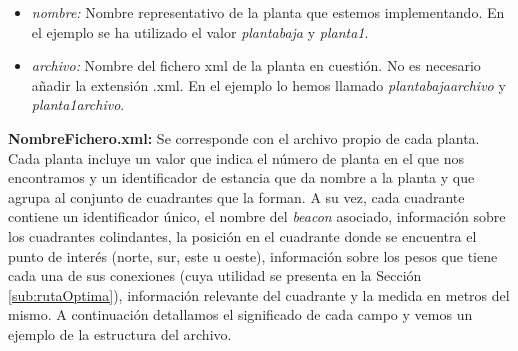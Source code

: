 \begin{itemize}
	\item \textit{nombre:} Nombre representativo de la planta que estemos implementando. En el ejemplo se ha utilizado el valor \textit{plantabaja} y \textit{planta1}.
	
	\item \textit{archivo:} Nombre del fichero xml de la planta en cuestión. No es necesario añadir la extensión .xml. En el ejemplo lo hemos llamado \textit{plantabajaarchivo} y \textit{planta1archivo}.
\end{itemize}






\textbf{NombreFichero.xml:} Se corresponde con el archivo propio de cada planta. Cada planta incluye un valor que indica el número de planta en el que nos encontramos y un identificador de estancia que da nombre a la planta y que agrupa al conjunto de cuadrantes que la forman. A su vez, cada cuadrante contiene un identificador único, el nombre del \textit{beacon} asociado, información sobre los cuadrantes colindantes, la posición en el cuadrante donde se encuentra el punto de interés (norte, sur, este u oeste), información sobre los pesos que tiene cada una de sus conexiones (cuya utilidad se presenta en la Sección \ref{sub:rutaOptima}), información relevante del cuadrante y la medida en metros del mismo. A continuación detallamos el significado de cada campo y vemos un ejemplo de la estructura del archivo.

